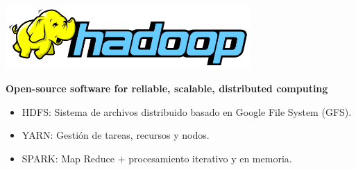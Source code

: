		\begin{frame}{}
			\kern-3mm
			\begin{center}
				\includegraphics[width=0.7\textwidth]{./Images/hadoop.png}
				\kern-2mm
				\begin{tcolorbox}[colback=ChetwodeBlue!10,colframe=ChetwodeBlue!60]
					\fontsize{8}{8}\selectfont
					\centering
					\textbf{Open-source software for reliable, scalable, distributed computing}
				\end{tcolorbox}
			\end{center}
	
			\centering
			\kern-3mm
			\fontsize{6}{8}\selectfont
			\begin{itemize}
				\item HDFS: Sistema de archivos distribuido basado en Google File System (GFS).
				\item YARN: Gestión de tareas, recursos y nodos.
				\item SPARK: Map Reduce + procesamiento iterativo y en memoria.
			\end{itemize}

						
		\end{frame}
